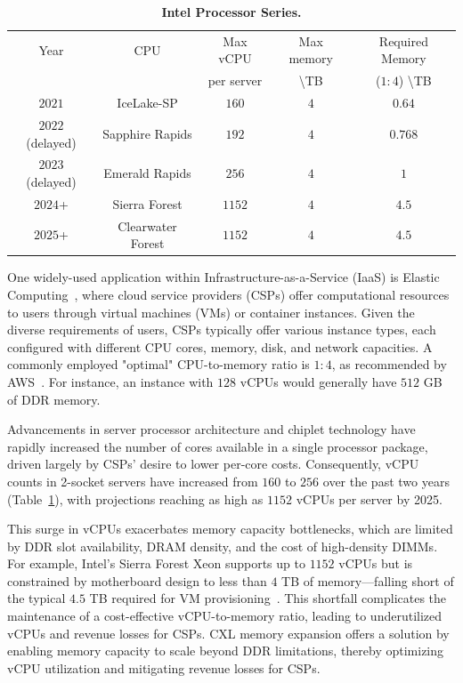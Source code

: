 \begin{table}[!]
  \centering
  \small
  \begin{tabular}{c|c|c|c|c} 
        \hline
        Year & CPU & Max vCPU  &  Max memory & Required Memory \\
        & & per server &  \textbackslash TB & ($1:4$) \textbackslash TB\\\hline
        $2021$ & IceLake-SP\cite{icelakecores} & $160$  & $4$ & $0.64$ \\\hline
        $2022$ (delayed) & Sapphire Rapids\cite{sprcores} & $192$  & 	$4$ & $0.768$ \\\hline
        $2023$ (delayed) & Emerald Rapids\cite{emeraldrapidscores} & $256$ & $4$ & $1$ \\\hline
        $2024$+  & Sierra Forest\cite{sierraforestcores} & $1152$ & $4$ & $4.5$ \\\hline
        $2025$+ & Clearwater Forest\cite{clearwatercores} & $1152$ & $4$ & $4.5$ \\\hline
  \end{tabular}
  \caption[Intel Processor Series]{\textbf{Intel Processor Series.} }
  \label{tab:amd}
\end{table}

One widely-used application within Infrastructure-as-a-Service (IaaS) is Elastic Computing~\cite{elasticcomputing}, where cloud service providers (CSPs) offer computational resources to users through virtual machines (VMs) or container instances. Given the diverse requirements of users, CSPs typically offer various instance types, each configured with different CPU cores, memory, disk, and network capacities. A commonly employed "optimal" CPU-to-memory ratio is $1:4$, as recommended by AWS~\cite{awsm7a, awsm7i}. For instance, an instance with $128$ vCPUs would generally have $512$ GB of DDR memory.

Advancements in server processor architecture and chiplet technology have rapidly increased the number of cores available in a single processor package, driven largely by CSPs' desire to lower per-core costs. Consequently, vCPU counts in 2-socket servers have increased from $160$ to $256$ over the past two years (Table~\ref{tab:amd}), with projections reaching as high as $1152$ vCPUs per server by 2025.

This surge in vCPUs exacerbates memory capacity bottlenecks, which are limited by DDR slot availability, DRAM density, and the cost of high-density DIMMs. For example, Intel's Sierra Forest Xeon supports up to $1152$ vCPUs but is constrained by motherboard design to less than $4$ TB of memory—falling short of the typical $4.5$ TB required for VM provisioning~\cite{1dpc}. This shortfall complicates the maintenance of a cost-effective vCPU-to-memory ratio, leading to underutilized vCPUs and revenue losses for CSPs. CXL memory expansion offers a solution by enabling memory capacity to scale beyond DDR limitations, thereby optimizing vCPU utilization and mitigating revenue losses for CSPs.

